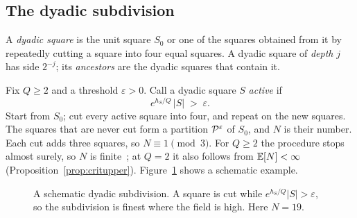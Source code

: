 \subsection{The dyadic subdivision}

A \emph{dyadic square} is the unit square $S_0$ or one of the squares obtained from it by
repeatedly cutting a square into four equal squares. A dyadic square of \emph{depth} $j$ has side
$2^{-j}$; its \emph{ancestors} are the dyadic squares that contain it.

Fix $Q\ge2$ and a threshold $\varepsilon>0$. Call a dyadic square $S$ \emph{active} if
\begin{equation}\label{eq:rule}
e^{h_S/Q}\,|S|\;>\;\varepsilon .
\end{equation}
Start from $S_0$; cut every active square into four, and repeat on the new squares. The squares
that are never cut form a partition $\mathcal{P}^\varepsilon$ of $S_0$, and $N$ is their number. Each cut
adds three squares, so $N\equiv1\pmod 3$. For $Q\ge2$ the procedure stops almost surely, so $N$ is
finite~\cite{APPS}; at $Q=2$ it also follows from $\mathbb{E}[N]<\infty$ (Proposition~\ref{prop:critupper}). Figure~\ref{fig:subdivision} shows a schematic example.

\begin{figure}[htb]
\centering
{}
\caption{A schematic dyadic subdivision. A square is cut while $e^{h_S/Q}|S|>\varepsilon$, so the
subdivision is finest where the field is high. Here $N=19$.}
\label{fig:subdivision}
\end{figure}

